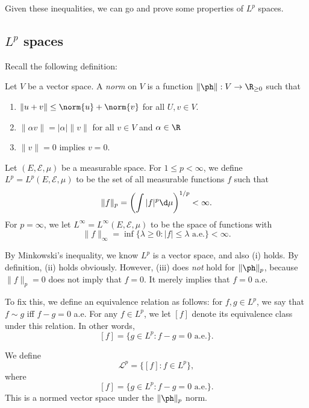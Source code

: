 \documentclass[a4paper]{article}
\begin{document}
Given these inequalities, we can go and prove some properties of $L^p$ spaces.

\subsection{\texorpdfstring{$L^p$}{Lp} spaces}
Recall the following definition:

\begin{defi}
  Let $V$ be a vector space. A \emph{norm} on $V$ is a function $\|\ph\|: V \to \R_{\geq 0}$ such that
  \begin{enumerate}
    \item $\|u + v\| \leq \norm{u} + \norm{v}$ for all $U, v \in V$.
    \item $\|\alpha v\| = |\alpha|\|v\|$ for all $v \in V$ and $\alpha \in \R$
    \item $\|v\| = 0$ implies $v = 0$.
  \end{enumerate}
\end{defi}

\begin{defi}[$L^p$ spaces]
  Let $(E, \mathcal{E}, \mu)$ be a measurable space. For $1 \leq p < \infty$, we define $L^p = L^p(E, \mathcal{E}, \mu)$ to be the set of all measurable functions $f$ such that
  \[
    \|f\|_p = \left(\int |f|^p \d \mu\right)^{1/p} < \infty.
  \]
  For $p = \infty$, we let $L^\infty = L^\infty(E, \mathcal{E}, \mu)$ to be the space of functions with
  \[
    \|f\|_{\infty} = \inf \{\lambda \geq 0: |f| \leq \lambda \text{ a.e.}\} < \infty.
  \]
\end{defi}

By Minkowski's inequality, we know $L^p$ is a vector space, and also (i) holds. By definition, (ii) holds obviously. However, (iii) does \emph{not} hold for $\|\ph\|_p$, because $\|f\|_p = 0$ does not imply that $f = 0$. It merely implies that $f = 0$ a.e.

To fix this, we define an equivalence relation as follows: for $f, g \in L^p$, we say that $f \sim g$ iff $f - g = 0$ a.e. For any $f \in L^p$, we let $[f]$ denote its equivalence class under this relation. In other words,
\[
  [f] = \{g \in L^p: f - g = 0\text{ a.e.}\}.
\]
\begin{defi}
  We define
  \[
    \mathcal{L}^p = \{[f]: f \in L^p\},
  \]
  where
  \[
    [f] = \{g \in L^p: f - g = 0\text{ a.e.}\}.
  \]
  This is a normed vector space under the $\|\ph\|_p$ norm.
\end{defi}
\end{document}
